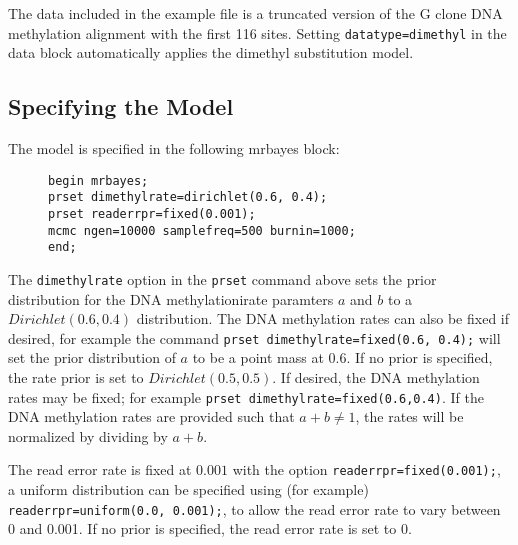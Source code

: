 \documentclass[12pt]{article}
\begin{document}
The data included in the example file is a truncated version of the G clone 
DNA methylation alignment with the first 116 sites. Setting  \texttt{datatype=dimethyl}
in the data block automatically applies the dimethyl substitution model.

\subsection{Specifying the Model}

The model is specified in the following mrbayes block:

\begin{figure}[h]
\centering
\begin{BVerbatim}
begin mrbayes;
prset dimethylrate=dirichlet(0.6, 0.4);
prset readerrpr=fixed(0.001);
mcmc ngen=10000 samplefreq=500 burnin=1000;
end;
\end{BVerbatim}
\end{figure}

The \texttt{dimethylrate} option in the \texttt{prset} command above sets the prior distribution
for the DNA methylationirate paramters \(a\) and \(b\) to a \(Dirichlet(0.6,0.4)\) distribution. 
The DNA methylation rates can also be fixed if desired, for example the command 
\texttt{prset dimethylrate=fixed(0.6, 0.4);} will set the prior distribution of \(a\) to be a point mass
at \(0.6\). If no prior is specified, the rate prior is set to \(Dirichlet(0.5, 0.5)\).
If desired, the DNA methylation rates may be fixed; for example \texttt{prset dimethylrate=fixed(0.6,0.4)}.
If the DNA methylation rates are provided such that \(a + b \neq 1\), the rates will be normalized by 
dividing by \(a + b\).

The read error rate is fixed at \(0.001\) with the option 
\texttt{readerrpr=fixed(0.001);}, a uniform distribution can be specified using (for example)
\texttt{readerrpr=uniform(0.0, 0.001);}, to allow the read error rate to vary between 0 and 0.001.
If no prior is specified, the read error rate is set to 0.
\end{document}
